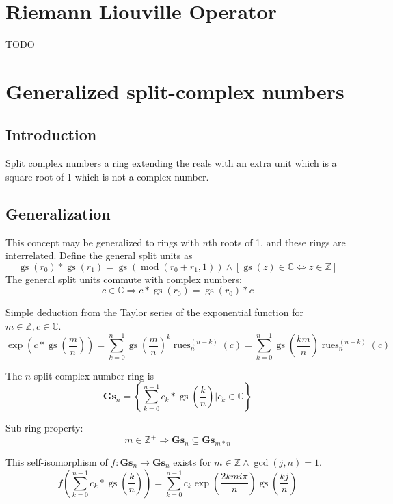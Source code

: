 \documentclass[]{article}
\DeclareMathOperator{\rues}{rues}
\DeclareMathOperator{\gs}{gs}
\DeclareMathOperator{\md}{mod}
\newcommand{\pqty}[1]{{\left(#1\right)}}
\newcommand{\Bqty}[1]{{\left\{#1\right\}}}
\newcommand{\bqty}[1]{{\left[#1\right]}}
\numberwithin{equation}{section}
\begin{document}
	\section{Riemann Liouville Operator}
	TODO
	
	\section{Generalized split-complex numbers}
	\subsection{Introduction}
	Split complex numbers a ring extending the reals with an extra unit which is a square root of 1 which is not a complex number.
	\subsection{Generalization}
	This concept may be generalized to rings with $n$th roots of 1, and these rings are interrelated. Define the general split units as
	\begin{equation}
	\gs\pqty{r_0}*\gs\pqty{r_1}=\gs\pqty{\md\pqty{r_0+r_1,1}}
	\land
	\bqty{\gs\pqty{z}\in\mathbb{C}\Leftrightarrow z\in\mathbb{Z}}
	\end{equation}
	The general split units commute with complex numbers:
	\begin{equation}
	c\in\mathbb{C}\Rightarrow c*\gs\pqty{r_0}=\gs\pqty{r_0}*c
	\end{equation}
	
	Simple deduction from the Taylor series of the exponential function for $m\in\mathbb{Z}, c\in\mathbb{C}$.
	\begin{equation}
	\exp\pqty{c*\gs\pqty{\frac{m}{n}}}=\sum_{k=0}^{n-1}\gs\pqty{\frac{m}{n}}^k \rues_n^{(n-k)}\pqty{c}
	=\sum_{k=0}^{n-1}\gs\pqty{\frac{km}{n}} \rues_n^{(n-k)}\pqty{c}
	\end{equation}
	
	The $n$-split-complex number ring is
	\begin{equation}
	\mathbf{Gs}_n=\Bqty{\sum_{k=0}^{n-1} c_k*\gs\pqty{\frac{k}{n}} \Bigg\vert c_k\in\mathbb{C}}
	\end{equation}
	
	Sub-ring property:
	\begin{equation}
	m\in\mathbb{Z}^+\Rightarrow\mathbf{Gs}_n\subseteq\mathbf{Gs}_{m*n}
	\end{equation}
	
	This self-isomorphism of $f:\mathbf{Gs}_n\rightarrow\mathbf{Gs}_n$ exists for $m\in\mathbb{Z}\land\gcd\pqty{j,n}=1$.
	\begin{equation}
	f\pqty{\sum_{k=0}^{n-1} c_k*\gs\pqty{\frac{k}{n}}}=\sum_{k=0}^{n-1} c_k\exp\pqty{\frac{2kmi\pi}{n}}\gs\pqty{\frac{kj}{n}}
	\end{equation}
	
\end{document}

